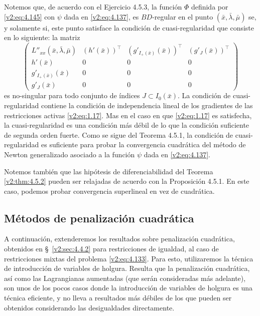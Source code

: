 Notemos que, de acuerdo con el Ejercicio 4.5.3, la función $\Phi$ definida por \eqref{v2:eq:4.145} con $\psi$ dada en \eqref{v2:eq:4.137}, es $BD$-regular en el punto $(\bar{x}, \bar{\lambda}, \bar{\mu})$ se, y solamente si, este punto satisface la condición de cuasi-regularidad que consiste en lo siguiente: la matriz
\[
    \begin{pmatrix} L''_{xx}(\bar{x}, \bar{\lambda}, \bar{\mu}) & (h'(\bar{x}))^\top & (g'_{I_+(\bar{x})}(\bar{x}))^\top & (g'_J(\bar{x}))^\top \\
    h'(\bar{x}) & 0 & 0 & 0 \\
    g'_{I_+(\bar{x})}(\bar{x}) & 0 & 0 & 0 \\
    g'_J(\bar{x}) & 0 & 0 & 0 \end{pmatrix}
\]
es no-singular para todo conjunto de índices $J \subset I_0(\bar{x})$. La condición de cuasi-regularidad contiene la condición de independencia lineal de los gradientes de las restricciones activas \eqref{v2:eq:1.17}. Mas en el caso en que \eqref{v2:eq:1.17} es satisfecha, la cuasi-regularidad es una condición más débil de lo que la condición suficiente de segunda orden fuerte. Como se sigue del Teorema 4.5.1, la condición de cuasi-regularidad es suficiente para probar la convergencia cuadrática del método de Newton generalizado asociado a la función $\psi$ dada en \eqref{v2:eq:4.137}.

Notemos también que las hipótesis de diferenciabilidad del Teorema \ref{v2:thm:4.5.2} pueden ser relajadas de acuerdo con la Proposición 4.5.1. En este caso, podemos probar convergencia superlineal en vez de cuadrática.

\subsection{Métodos de penalización cuadrática}\label{v2:sec:4.5.3}

A continuación, extenderemos los resultados sobre penalización cuadrática, obtenidos en \S~\ref{v2:sec:4.4.2} para restricciones de igualdad, al caso de restricciones mixtas del problema \eqref{v2:eq:4.133}. Para esto, utilizaremos la técnica de introducción de variables de holgura. Resulta que la penalización cuadrática, así como las Lagrangianas aumentadas (que serán consideradas más adelante), son unos de los pocos casos donde la introducción de variables de holgura es una técnica eficiente, y no lleva a resultados más débiles de los que pueden ser obtenidos considerando las desigualdades directamente.

